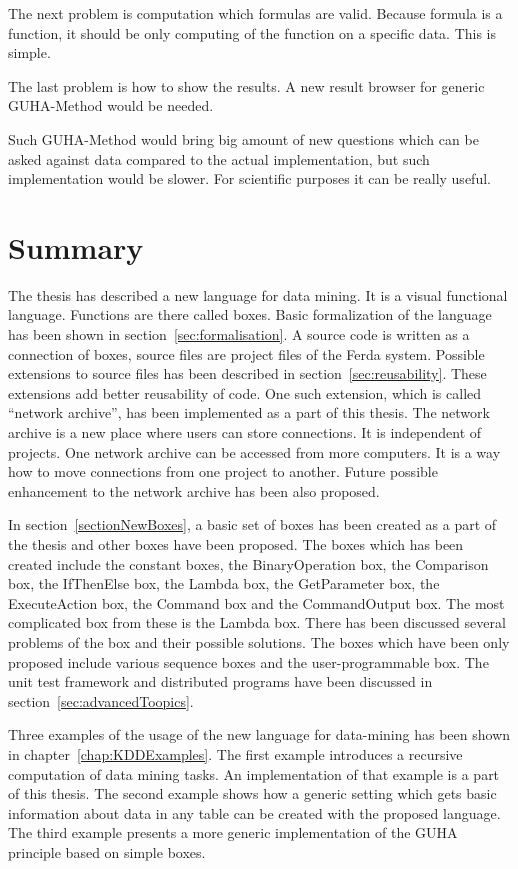 \documentclass[a4paper,12pt]{book}
\begin{document}
The next problem is computation which formulas are valid. Because formula is a function, it should be only computing of the function on a specific data. This is simple.

The last problem is how to show the results. A new result browser for generic GUHA-Method would be needed.

Such GUHA-Method would bring big amount of new questions which can be asked against data compared to the actual implementation, but such implementation would be slower. For scientific purposes it can be really useful.

\chapter{Summary}
The thesis has described a new language for data mining. It is a visual functional language. Functions are there called boxes. Basic formalization of the language has been shown in section~\ref{sec:formalisation}. A source code is written as a connection of boxes, source files are project files of the Ferda system. Possible extensions to source files has been described in section~\ref{sec:reusability}. These extensions add better reusability of code. One such extension, which is called ``network archive'', has been implemented as a part of this thesis. The network archive is a new place where users can store connections. It is independent of projects. One network archive can be accessed from more computers. It is a way how to move connections from one project to another. Future possible enhancement to the network archive has been also proposed.

In section~\ref{sectionNewBoxes}, a basic set of boxes has been created as a part of the thesis and other boxes have been proposed. The boxes which has been created include the constant boxes, the BinaryOperation box, the Comparison box, the IfThenElse box, the Lambda box, the GetParameter box, the ExecuteAction box, the Command box and the CommandOutput box. The most complicated box from these is the Lambda box. There has been discussed several problems of the box and their possible solutions. The boxes which have been only proposed include various sequence boxes and the user-programmable box. The unit test framework and distributed programs have been discussed in section~\ref{sec:advancedToopics}.

Three examples of the usage of the new language for data-mining has been shown in chapter~\ref{chap:KDDExamples}. The first example introduces a recursive computation of data mining tasks. An implementation of that example is a part of this thesis. The second example shows how a generic setting which gets basic information about data in any table can be created with the proposed language. The third example presents a more generic implementation of the GUHA principle based on simple boxes.
\end{document}
